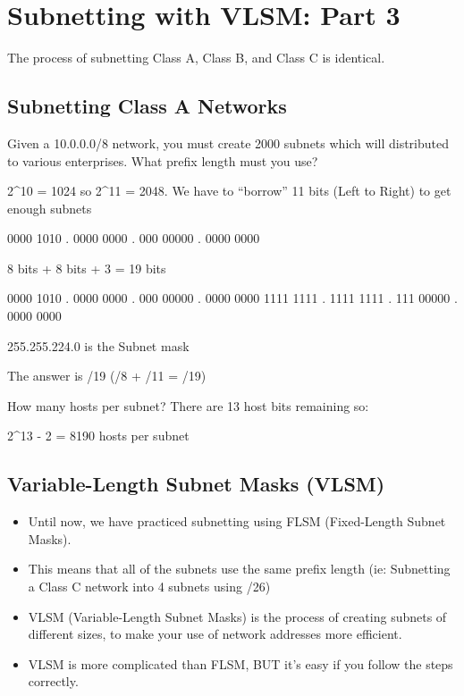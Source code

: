 \chapter{Subnetting with VLSM: Part
3}\label{subnetting-with-vlsm-part-3}

The process of subnetting Class A, Class B, and Class C is identical.

\section{Subnetting Class A Networks}\label{subnetting-class-a-networks}

Given a 10.0.0.0/8 network, you must create 2000 subnets which will
distributed to various enterprises. What prefix length must you use?

2\^{}10 = 1024 so 2\^{}11 = 2048. We have to ``borrow'' 11 bits (Left to
Right) to get enough subnets

0000 1010 . 0000 0000 . 000 \textbar{} 00000 . 0000 0000

8 bits + 8 bits + 3 = 19 bits

0000 1010 . 0000 0000 . 000 \textbar{} 00000 . 0000 0000 1111 1111 .
1111 1111 . 111 \textbar{} 00000 . 0000 0000

255.255.224.0 is the Subnet mask

The answer is /19 (/8 + /11 = /19)

How many hosts per subnet? There are 13 host bits remaining so:

2\^{}13 - 2 = 8190 hosts per subnet

\section{Variable-Length Subnet Masks
(VLSM)}\label{variable-length-subnet-masks-vlsm}

\begin{itemize}
\tightlist
\item
  Until now, we have practiced subnetting using FLSM (Fixed-Length
  Subnet Masks).
\item
  This means that all of the subnets use the same prefix length (ie:
  Subnetting a Class C network into 4 subnets using /26)
\item
  VLSM (Variable-Length Subnet Masks) is the process of creating subnets
  of different sizes, to make your use of network addresses more
  efficient.
\item
  VLSM is more complicated than FLSM, BUT it's easy if you follow the
  steps correctly.
\end{itemize}

